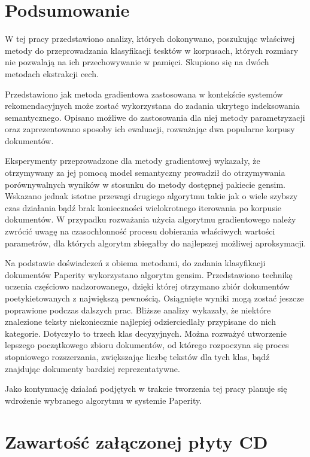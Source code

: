 \documentclass{pracamgr}
\begin{document}
\chapter{Podsumowanie}

W tej pracy przedstawiono analizy, których dokonywano, poszukując właściwej metody do przeprowadzania klasyfikacji tesktów w korpusach, których rozmiary nie pozwalają na ich przechowywanie w pamięci. Skupiono się na dwóch metodach ekstrakcji cech.

Przedstawiono jak metoda gradientowa zastosowana w kontekście systemów rekomendacyjnych może zostać wykorzystana do zadania ukrytego indeksowania semantycznego. Opisano możliwe do zastosowania dla niej metody parametryzacji oraz zaprezentowano sposoby ich ewaluacji, rozważając dwa popularne korpusy dokumentów.

Eksperymenty przeprowadzone dla metody gradientowej wykazały, że otrzymywany za jej pomocą model semantyczny prowadził do otrzymywania porównywalnych wyników w stosunku do metody dostępnej pakiecie gensim. Wskazano jednak istotne przewagi drugiego algorytmu takie jak o wiele szybszy czas działania bądź brak konieczności wielokrotnego iterowania po korpusie dokumentów. W przypadku rozważania użycia algorytmu gradientowego należy zwrócić uwagę na czasochłonność procesu dobierania właściwych wartości parametrów, dla których algorytm zbiegałby do najlepszej możliwej aproksymacji. 

Na podstawie doświadczeń z obiema metodami, do zadania klasyfikacji dokumentów Paperity wykorzystano algorytm gensim. Przedstawiono technikę uczenia częściowo nadzorowanego, dzięki której otrzymano zbiór dokumentów poetykietowanych z największą pewnością. Osiągnięte wyniki mogą zostać jeszcze poprawione podczas dalszych prac. Bliższe analizy wykazały, że niektóre znalezione teksty niekoniecznie najlepiej odzierciedlały przypisane do nich kategorie. Dotyczyło to trzech klas decyzyjnych. Można rozważyć utworzenie lepszego początkowego zbioru dokumentów, od którego rozpoczyna się proces stopniowego rozszerzania, zwiększając liczbę tekstów dla tych klas, bądź znajdując dokumenty bardziej reprezentatywne.

Jako kontynuację działań podjętych w trakcie tworzenia tej pracy planuje się wdrożenie wybranego algorytmu w systemie Paperity.

\appendix
\chapter{Zawartość załączonej płyty CD}
\end{document}
